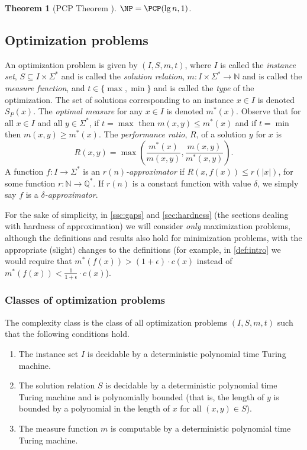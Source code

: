 \documentclass[]{article}
\theoremstyle{plain}
\newtheorem{theorem}{Theorem}
\theoremstyle{definition}
\begin{document}
\begin{theorem}[PCP Theorem \cite{pcp}]\label{thm:pcp}
  $\NP = \PCP(\lg n, 1)$.
\end{theorem}

\subsection{Optimization problems}

An optimization problem is given by $(I, S, m, t)$, where $I$ is called the \emph{instance set}, $S \subseteq I \times \Sigma^*$ and is called the \emph{solution relation}, $m \colon I \times \Sigma^* \to \mathbb{N}$ and is called the \emph{measure function}, and $t\in\{\max, \min\}$ and is called the \emph{type} of the optimization.
The set of solutions corresponding to an instance $x \in I$ is denoted $S_P(x)$.
The \emph{optimal measure} for any $x \in I$ is denoted $m^*(x)$.
Observe that for all $x \in I$ and all $y \in \Sigma^*$, if $t = \max$ then $m(x, y) \leq m^*(x)$ and if $t = \min$ then $m(x, y) \geq m^*(x)$.
The \emph{performance ratio}, $R$, of a solution $y$ for $x$ is
\begin{displaymath}
  R(x, y) = \max{\left(\frac{m^*(x)}{m(x, y)}, \frac{m(x, y)}{m^*(x, y)}\right)}.
\end{displaymath}
A function $f \colon I \to \Sigma^*$ is an \emph{$r(n)$-approximator} if $R(x, f(x)) \leq r(|x|)$, for some function $r \colon \mathbb{N} \to \mathbb{Q}^*$.
If $r(n)$ is a constant function with value $\delta$, we simply say $f$ is a \emph{$\delta$-approximator}.

For the sake of simplicity, in \autoref{ssc:gaps} and \autoref{sec:hardness} (the sections dealing with hardness of approximation) we will consider \emph{only} maximization problems, although the definitions and results also hold for minimization problems, with the appropriate (slight) changes to the definitions (for example, in \autoref{def:intro} we would require that $m^*(f(x)) > (1 + \epsilon) \cdot c(x)$ instead of $m^*(f(x)) < \frac{1}{1 + \epsilon} \cdot c(x)$).

\subsubsection{Classes of optimization problems}

The complexity class \NPO{} is the class of all optimization problems $(I, S, m, t)$ such that the following conditions hold.
\begin{enumerate}
\item The instance set $I$ is decidable by a deterministic polynomial time Turing machine.
\item The solution relation $S$ is decidable by a deterministic polynomial time Turing machine and is polynomially bounded (that is, the length of $y$ is bounded by a polynomial in the length of $x$ for all $(x, y)\in S$).
\item The measure function $m$ is computable by a deterministic polynomial time Turing machine.
\end{enumerate}
\end{document}
